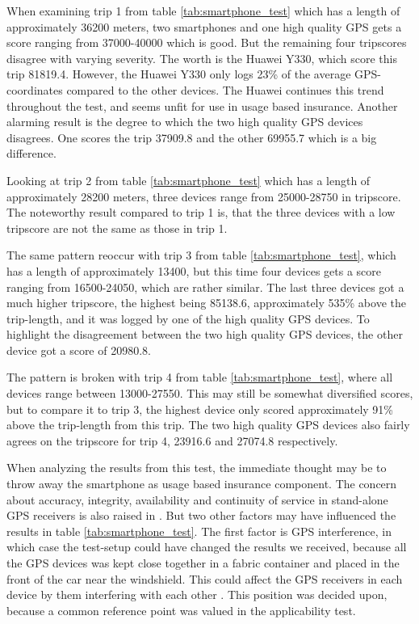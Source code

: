 When examining trip 1 from table \ref{tab:smartphone_test} which has a length of approximately 36200 meters, two smartphones and one high quality GPS gets a score ranging from 37000-40000 which is good. But the remaining four tripscores disagree with varying severity. The worth is the Huawei Y330, which score this trip 81819.4. However, the Huawei Y330 only logs 23\% of the average GPS-coordinates compared to the other devices. The Huawei continues this trend throughout the test, and seems unfit for use in usage based insurance. Another alarming result is the degree to which the two high quality GPS devices disagrees. One scores the trip 37909.8 and the other 69955.7 which is a big difference.

Looking at trip 2 from table \ref{tab:smartphone_test} which has a length of approximately 28200 meters, three devices range from 25000-28750 in tripscore. The noteworthy result compared to trip 1 is, that the three devices with a low tripscore are not the same as those in trip 1.

The same pattern reoccur with trip 3 from table \ref{tab:smartphone_test}, which has a length of approximately 13400, but this time four devices gets a score ranging from 16500-24050, which are rather similar. The last three devices got a much higher tripscore, the highest being 85138.6, approximately 535\% above the trip-length, and it was logged by one of the high quality GPS devices. To highlight the disagreement between the two high quality GPS devices, the other device got a score of 20980.8. 

The pattern is broken with trip 4 from table \ref{tab:smartphone_test}, where all devices range between 13000-27550. This may still be somewhat diversified scores, but to compare it to trip 3, the highest device only scored approximately 91\% above the trip-length from this trip. The two high quality GPS devices also fairly agrees on the tripscore for trip 4, 23916.6 and 27074.8 respectively. 

When analyzing the results from this test, the immediate thought may be to throw away the smartphone as usage based insurance component. The concern about accuracy, integrity, availability and continuity of service in stand-alone GPS receivers is also raised in\citep{art:challenges_smartphone_ubi} \citep{art:survey_mobile_phone_sensing} \citep{art:smartphones_for_monitoring_and_ubi} \citep{art:insurtelematics} \citep{art:in-car_positioning_technologies}. But two other factors may have influenced the results in table \ref{tab:smartphone_test}. The first factor is GPS interference, in which case the test-setup could have changed the results we received, because all the GPS devices was kept close together in a fabric container and placed in the front of the car near the windshield. This could affect the GPS receivers in each device by them interfering with each other\citep{art:gps_interference_one} \citep{art:gps_interference_two}. This position was decided upon, because a common reference point was valued in the applicability test. 

